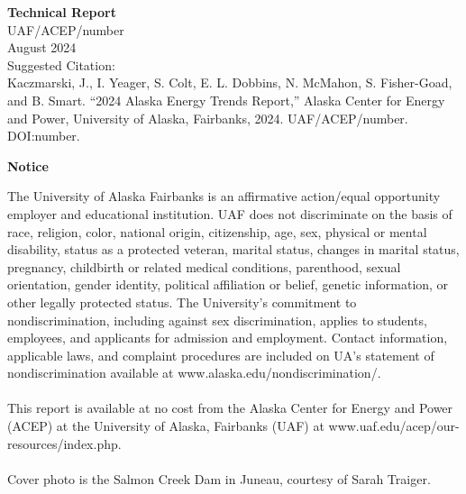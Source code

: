 \newpage
\noindent
{\normalsize\bfseries Technical Report} \\
UAF/ACEP/number \\ 
\vspace{3ex}
August 2024 \\
Suggested Citation: \\
Kaczmarski, J., I. Yeager, S. Colt, E. L. Dobbins, N. McMahon, S. Fisher-Goad, and B. Smart. “2024 Alaska Energy Trends Report,” Alaska Center for Energy and Power, University of Alaska, Fairbanks, 2024. UAF/ACEP/number. DOI:number. 

\vspace{30ex}
\noindent
{\centering
\bfseries\normalsize Notice
\par
}
\small The University of Alaska Fairbanks is an affirmative action/equal opportunity employer and educational institution. UAF does not discriminate on the basis of race, religion, color, national origin, citizenship, age, sex, physical or mental disability, status as a protected veteran, marital status, changes in marital status, pregnancy, childbirth or related medical conditions, parenthood, sexual orientation, gender identity, political affiliation or belief, genetic information, or other legally protected status. The University's commitment to nondiscrimination, including against sex discrimination, applies to students, employees, and applicants for admission and employment. Contact information, applicable laws, and complaint procedures are included on UA's statement of nondiscrimination available at www.alaska.edu/nondiscrimination/. \\
\\
\small This report is available at no cost from the Alaska Center for Energy and Power (ACEP) at the University of Alaska, Fairbanks (UAF) at www.uaf.edu/acep/our-resources/index.php. \\
\\
\small Cover photo is the Salmon Creek Dam in Juneau, courtesy of Sarah Traiger.